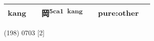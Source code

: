 \documentclass[14pt,a4paper]{scrartcl}
\begin{document}
\begin{longtable}[c]{@{}llllll@{}}
\begin{minipage}[t]{0.14\columnwidth}
kang
\strut\end{minipage} &
\begin{minipage}[t]{0.14\columnwidth}\raggedright\strut
\strut\end{minipage} &
\begin{minipage}[t]{0.14\columnwidth}\raggedright\strut
岡\textsuperscript{5ca1~kang}
\strut\end{minipage} &
\begin{minipage}[t]{0.14\columnwidth}\raggedright\strut
\strut\end{minipage} &
\begin{minipage}[t]{0.14\columnwidth}\raggedright\strut
pure:other
\strut\end{minipage}\tabularnewline
\bottomrule
\end{longtable}

(198) 0703 {[}2{]}
\end{document}
